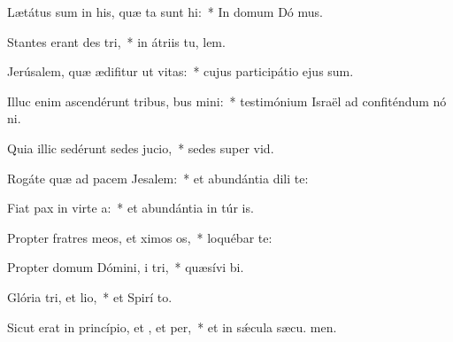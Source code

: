 \item Lætátus sum in his, quæ ta sunt hi:~* In domum Dó mus.
\item Stantes erant des tri,~* in átriis tu, lem.
\item Jerúsalem, quæ ædifitur ut vitas:~* cujus participátio ejus  sum.
\item Illuc enim ascendérunt tribus, bus mini:~* testimónium Israël ad confiténdum nó ni.
\item Quia illic sedérunt sedes  jucio,~* sedes super  vid.
\item Rogáte quæ ad pacem  Jesalem:~* et abundántia dili te:
\item Fiat pax in virte a:~* et abundántia in túr is.
\item Propter fratres meos, et ximos os,~* loquébar   te:
\item Propter domum Dómini, i tri,~* quæsívi  bi.
\item Glória tri, et lio,~* et Spirí to.
\item Sicut erat in princípio, et , et per,~* et in sǽcula sæcu. men.
